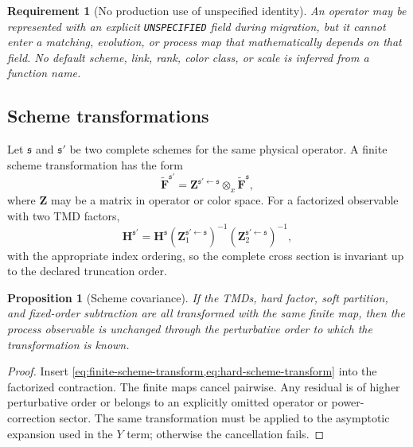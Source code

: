 \documentclass[11pt]{article}
\newtheorem{requirement}[definition]{Requirement}
\newtheorem{proposition}[definition]{Proposition}
\newcommand{\otimesx}{\mathop{\otimes}_{x}}
\begin{document}
\begin{requirement}[No production use of unspecified identity]
An operator may be represented with an explicit \texttt{UNSPECIFIED} field
during migration, but it cannot enter a matching, evolution, or process map
that mathematically depends on that field.  No default scheme, link, rank,
color class, or scale is inferred from a function name.
\end{requirement}

\subsection{Scheme transformations}

Let \(\mathfrak s\) and \(\mathfrak s'\) be two complete schemes for the same
physical operator.  A finite scheme transformation has the form
\begin{equation}
 \widetilde{\bm F}^{\mathfrak s'}
 =\bm Z^{\mathfrak s'\leftarrow\mathfrak s}
  \otimesx
  \widetilde{\bm F}^{\mathfrak s},
 \label{eq:finite-scheme-transform}
\end{equation}
where \(\bm Z\) may be a matrix in operator or color space.  For a factorized
observable with two TMD factors,
\begin{equation}
 \bm H^{\mathfrak s'}
 =
 \bm H^{\mathfrak s}
 \left(\bm Z_1^{\mathfrak s'\leftarrow\mathfrak s}\right)^{-1}
 \left(\bm Z_2^{\mathfrak s'\leftarrow\mathfrak s}\right)^{-1},
 \label{eq:hard-scheme-transform}
\end{equation}
with the appropriate index ordering, so the complete cross section is
invariant up to the declared truncation order.

\begin{proposition}[Scheme covariance]
If the TMDs, hard factor, soft partition, and fixed-order subtraction are all
transformed with the same finite map, then the process observable is unchanged
through the perturbative order to which the transformation is known.
\end{proposition}

\begin{proof}
Insert \cref{eq:finite-scheme-transform,eq:hard-scheme-transform} into the
factorized contraction.  The finite maps cancel pairwise.  Any residual is of
higher perturbative order or belongs to an explicitly omitted operator or
power-correction sector.  The same transformation must be applied to the
asymptotic expansion used in the \(Y\) term; otherwise the cancellation fails.
\end{proof}
\end{document}
